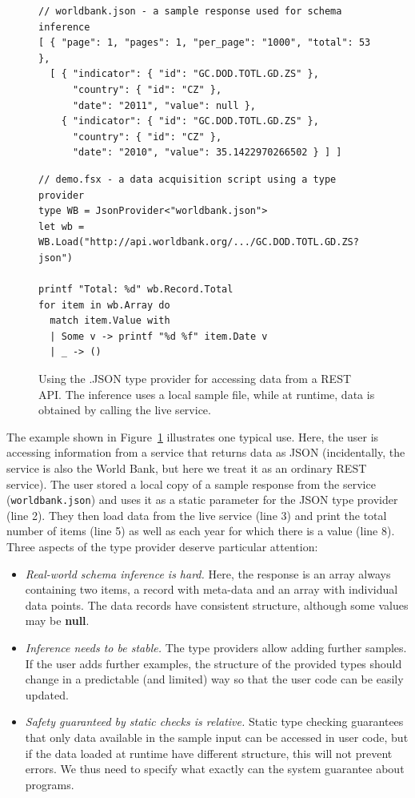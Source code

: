 \documentclass[fleqn,11pt]{report}
\newcommand{\kvd}[1]{\textnormal{\ttfamily\bfseries #1}}
\theoremstyle{definition}
\newenvironment{nitemize}
{ \vspace{-0.4em}
  \begin{itemize}
    \setlength{\itemsep}{5pt}
    \setlength{\parskip}{0pt}
    \setlength{\parsep}{0pt} }
{ \end{itemize}
  \vspace{-0.4em} }
\begin{document}
\begin{figure}[t]
\begin{lstlisting}[language=sharp]
// worldbank.json - a sample response used for schema inference
[ { "page": 1, "pages": 1, "per_page": "1000", "total": 53 },
  [ { "indicator": { "id": "GC.DOD.TOTL.GD.ZS" },
      "country": { "id": "CZ" },
      "date": "2011", "value": null },
    { "indicator": { "id": "GC.DOD.TOTL.GD.ZS" },
      "country": { "id": "CZ" },
      "date": "2010", "value": 35.1422970266502 } ] ]
\end{lstlisting}
\begin{lstlisting}[language=sharp]
// demo.fsx - a data acquisition script using a type provider
type WB = JsonProvider<"worldbank.json">
let wb = WB.Load("http://api.worldbank.org/.../GC.DOD.TOTL.GD.ZS?json")

printf "Total: %d" wb.Record.Total
for item in wb.Array do
  match item.Value with
  | Some v -> printf "%d %f" item.Date v
  | _ -> ()
\end{lstlisting}
\caption{Using the .JSON type provider for accessing data from a REST API. The inference uses
a local sample file, while at runtime, data is obtained by calling the live service.}
\label{fig:json}
\end{figure}

The example shown in Figure~\ref{fig:json} illustrates one typical use. Here, the user is
accessing information from a service that returns data as JSON (incidentally, the service is also
the World Bank, but here we treat it as an ordinary REST service). The user stored a local copy
of a sample response from the service (\texttt{worldbank.json}) and uses it as a static parameter
for the JSON type provider (line 2). They then load data from the live service (line 3)
and print the total number of items (line 5) as well as each year for which there is a value
(line 8). Three aspects of the type provider deserve particular attention:

\begin{nitemize}
\item \emph{Real-world schema inference is hard.} Here, the response is an array always containing
  two items, a record with meta-data and an array with individual data points. The data records
  have consistent structure, although some values may be \kvd{null}.
\item \emph{Inference needs to be stable.} The type providers allow adding further samples. If the
  user adds further examples, the structure of the provided types should change in a predictable
  (and limited) way so that the user code can be easily updated.
\item \emph{Safety guaranteed by static checks is relative.} Static type checking guarantees that
  only data available in the sample input can be accessed in user code, but if the data loaded at
  runtime have different structure, this will not prevent errors. We thus need to specify what
  exactly can the system guarantee about programs.
\end{nitemize}
\end{document}

